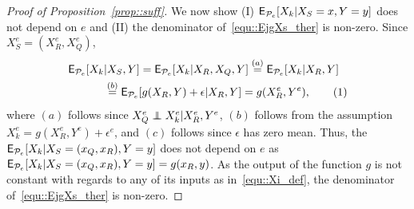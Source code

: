 \documentclass[conference,letterpaper]{IEEEtran}
\newcommand\numberthis{\addtocounter{equation}{1}\tag{\theequation}}
\newcommand\independent{\protect\mathpalette{\protect\independenT}{\perp}}
\def\independenT#1#2{\mathrel{\rlap{$#1#2$}\mkern2mu{#1#2}}}
\begin{document}
\begin{proof}[Proof of Proposition~\ref{prop::suff}]
We  now show (I) $\operatorname{\sf E}_{\mathcal{P}_e}[X_k|X_S=x,Y=y]$ does not depend on $e$ and (II) the denominator of~\eqref{equ::EjgXs_ther} is non-zero. Since $X_S^e = (X_R^e,X_Q^e)$, 
\begin{align*}
\E_{\Pc_e}[X_k&|X_S,Y]  = \E_{\Pc_e}[X_k|X_R,X_Q,Y] \overset{(a)}{=} \E_{\Pc_e}[X_k|X_R,Y] \\
   & \overset{(b)}{=} \E_{\Pc_e}[g(X_R,Y) + \epsilon |X_R,Y] = g(X_R^e,Y^e), \numberthis
\end{align*}
where $(a)$ follows since $X_Q^e \independent X_k^e | X_R^e,Y^e$, $(b)$ follows from the assumption $X^e_k = g(X_R^e,Y^e) + \epsilon^e$, and $(c)$ follows since $\epsilon$ has zero mean. Thus, the $\operatorname{\sf E}_{\mathcal{P}_e}[X_k|X_S=(x_Q,x_R),Y=y]$ does not depend on $e$ as $\operatorname{\sf E}_{\mathcal{P}_e}[X_k|X_S=(x_Q,x_R),Y=y] = g(x_R,y)$. As the output of the function $g$ is not constant with regards to any of its inputs as in~\eqref{equ::Xi_def}, the denominator of~\eqref{equ::EjgXs_ther} is non-zero.
\end{proof}


\balance



%
%



\balance

\newpage


\end{document}
